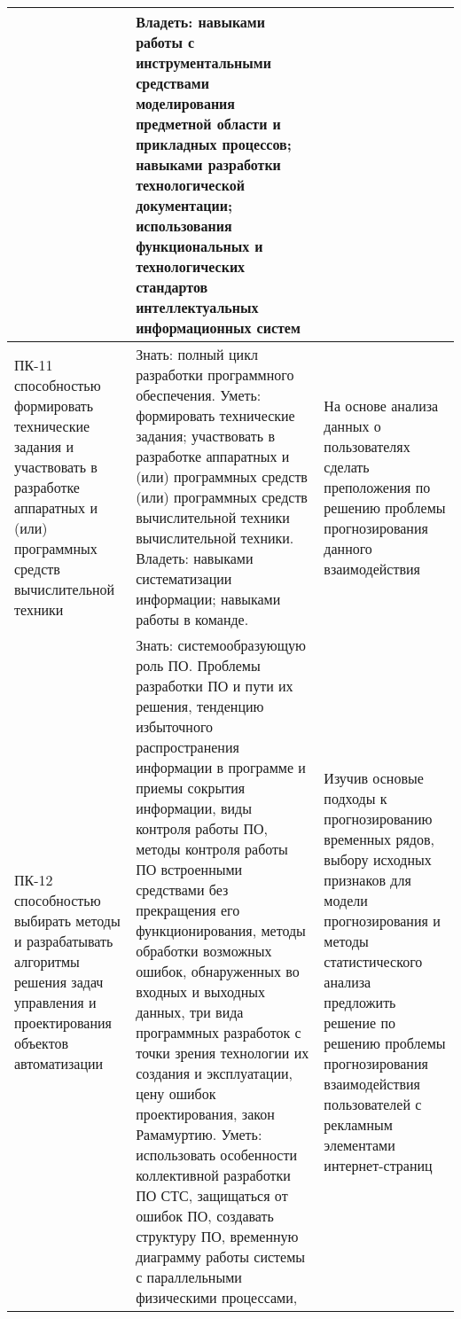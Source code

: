 \documentclass[a4paper, 12pt]{extreport}
\begin{document}
\begin{longtable}{|m{4.5cm}|m{6.5cm}|m{4.5cm}|}
                 & Владеть: навыками работы с инструментальными средствами моделирования предметной области и прикладных
                 процессов; навыками разработки технологической документации; использования функциональных и
                 технологических стандартов интеллектуальных информационных систем &  \\
                 \hline
                 ПК-11 способностью формировать технические задания и участвовать в разработке аппаратных и (или)
                 программных средств вычислительной техники
                 & Знать: полный цикл разработки программного обеспечения.
                 Уметь: формировать технические задания; участвовать в разработке аппаратных и (или) программных средств
                 (или) программных средств вычислительной техники вычислительной техники.
                 Владеть: навыками систематизации информации; навыками работы в команде.
                 & На основе анализа данных о пользователях сделать преположения по решению проблемы прогнозирования
                 данного взаимодействия \\
                 \hline
                 ПК-12 способностью выбирать методы и разрабатывать алгоритмы решения задач управления и проектирования
                 объектов автоматизации
                 & Знать: системообразующую роль ПО. Проблемы разработки ПО и пути их решения, тенденцию избыточного
                 распространения информации в программе и приемы сокрытия информации, виды контроля работы ПО, методы
                 контроля работы ПО встроенными средствами без прекращения его функционирования, методы обработки
                 возможных ошибок, обнаруженных во входных и выходных данных, три вида программных разработок с
                 точки зрения технологии их создания и эксплуатации, цену ошибок проектирования, закон Рамамуртию.
                 Уметь: использовать особенности коллективной разработки ПО СТС, защищаться от ошибок ПО, создавать
                 структуру ПО, временную диаграмму работы системы с параллельными физическими процессами, &
                 Изучив основые подходы к прогнозированию временных рядов, выбору исходных признаков для модели
                 прогнозирования и методы статистического анализа предложить решение по решению проблемы
                 прогнозирования взаимодействия пользователей с рекламным элементами интернет-страниц \\
                 \hline


\end{longtable}
\end{document}
